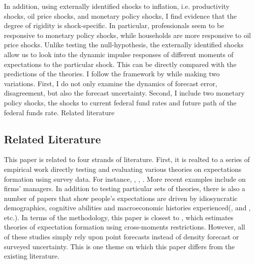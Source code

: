 \documentclass[12pt]{article}
\begin{document}
	In addition, using externally identified shocks to inflation, i.e. productivity shocks, oil price shocks, and monetary policy shocks, I find evidence that the degree of rigidity is shock-specific. In particular, professionals seem to be responsive to monetary policy shocks, while households are more responsive to oil price shocks. Unlike testing the null-hypothesis, the externally identified shocks allow us to look into the dynamic impulse responses of different moments of expectations to the particular shock. This can be directly compared with the predictions of the theories. I follow the framework by \cite{coibion2012can} while making two variations. First, I do not only examine the dynamics of forecast error, disagreement, but also the forecast uncertainty. Second, I include two monetary policy shocks, the shocks to current federal fund rates and future path of the federal funds rate. 
	Related literature 
	
	\subsection{Related Literature}
	This paper is related to four strands of literature. First, it is realted to a series of empirical work directly testing and evaluating  various theories on expectations formation using survey data. For instance, \citet{mankiw2003disagreement}, \citet{carroll2003macroeconomic}, \citet{branch2004theory}. More recent examples include \citet{coibion2018firms} on firms' managers. In addition to testing particular sets of theories, there is also a number of papers that show people's expectations are driven by idiosyncratic demographics, cognitive abilities and macroeconomic histories experienced(\citet{malmendier2015learning}, \citet{das2017socioeconomic} and \citet{d2019iq}, etc.). In terms of the methodology, this paper is closest to \cite{giacomini2020heterogeneity}, which estimates theories of expectation formation using cross-moments restrictions. However, all of these studies simply rely upon point forecasts instead of density forecast or surveyed uncertainty. This is one theme on which this paper differs from the existing literature.   
	
\end{document}
